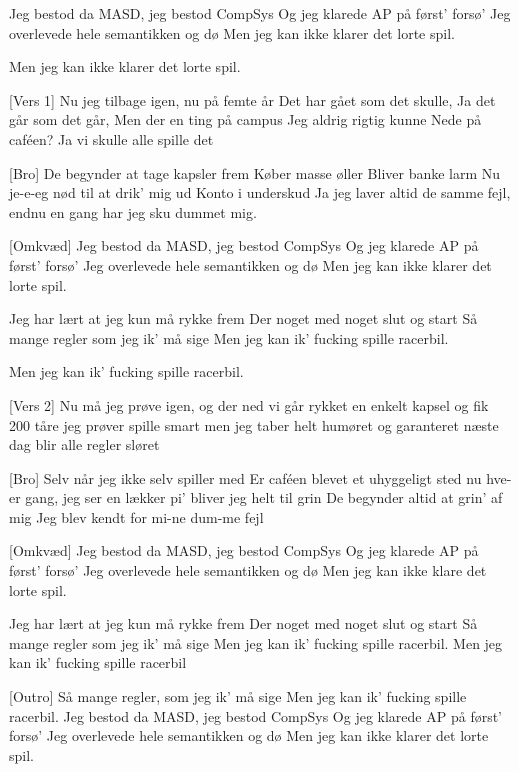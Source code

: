 \documentclass{article}
\begin{document}
\begin{song}
[Intro]
%
Jeg bestod da MASD,
 jeg bestod CompSys
Og jeg klarede AP
 på først’ forsø’
Jeg overlevede hele
 semantikken og dø
Men jeg kan ikke klarer det lorte spil.

Men jeg kan ikke klarer det lorte spil.

[Vers 1]
%
Nu jeg tilbage igen,
nu på femte år
Det har gået som det skulle,
Ja det går som det går,
Men der en ting på campus
Jeg aldrig rigtig kunne
Nede på caféen?
Ja vi skulle alle spille det

[Bro]
%
De begynder at 
tage kapsler frem
Køber masse øller
Bliver banke larm
Nu je-e-eg nød til at drik’ mig ud
Konto i underskud
Ja jeg laver altid de samme fejl,
endnu en gang har jeg sku dummet mig.

[Omkvæd]
%
Jeg bestod da MASD, 
jeg bestod CompSys
Og jeg klarede AP
på først’ forsø’
Jeg overlevede hele
 semantikken og dø
Men jeg kan ikke klarer det lorte spil.

Jeg har lært at jeg
kun må rykke frem
Der noget med
noget slut og start
Så mange regler
som jeg ik’ må sige
Men jeg kan ik’ fucking spille racerbil.

Men jeg kan ik’ fucking spille racerbil.

[Vers 2]
%
Nu må jeg prøve igen, 
og der ned vi går
rykket en enkelt kapsel
og fik 200 tåre
jeg prøver spille smart
men jeg taber helt humøret
og garanteret næste dag 
blir alle regler sløret

[Bro]
%
Selv når jeg ikke selv spiller med
Er caféen blevet et uhyggeligt sted
nu hve-er gang, jeg ser en lækker pi’
bliver jeg helt til grin
De begynder altid at grin’ af mig
Jeg blev kendt for mi-ne dum-me fejl

[Omkvæd]
%
Jeg bestod da MASD, 
jeg bestod CompSys
Og jeg klarede AP
på først’ forsø’
Jeg overlevede hele
 semantikken og dø
Men jeg kan ikke klare det lorte spil.

Jeg har lært at jeg
kun må rykke frem
Der noget med
noget slut og start
Så mange regler
som jeg ik’ må sige
Men jeg kan ik’ fucking spille racerbil.
Men jeg kan ik’ fucking spille racerbil

[Outro]
%
Så mange regler, som jeg ik’ må sige
Men jeg kan ik’ fucking spille racerbil.
Jeg bestod da MASD, 
jeg bestod CompSys
Og jeg klarede AP
på først’ forsø’
Jeg overlevede hele semantikken og dø
Men jeg kan ikke klarer det lorte spil.

\end{song}
\end{document}
